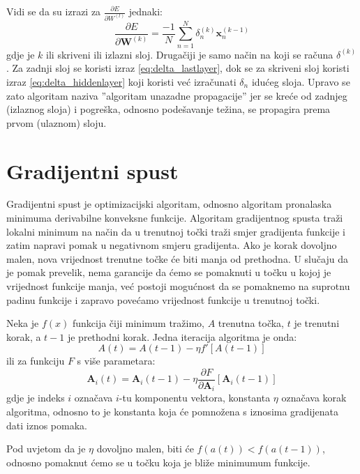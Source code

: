 \documentclass[times, utf8, diplomski, numeric]{fer}
\begin{document}
Vidi se da su izrazi za $\frac{\partial E}{\partial W^{(l)}}$ jednaki:
\begin{equation}
  \frac{\partial E}{\partial \boldsymbol{W}^{(k)}}
    = \frac{-1}{N} \sum_{n=1}^{N} \delta_n^{(k)} \boldsymbol{x}_n^{(k-1)}
\end{equation}
gdje je $k$ ili skriveni ili izlazni sloj. Drugačiji je samo način na koji se računa $\delta^{(k)}$. Za zadnji sloj se koristi izraz \ref{eq:delta_lastlayer}, dok se za skriveni sloj koristi izraz \ref{eq:delta_hiddenlayer} koji koristi već izračunati $\delta_n$ idućeg sloja. Upravo se zato algoritam naziva ''algoritam unazadne propagacije'' jer se kreće od zadnjeg (izlaznog sloja) i pogreška, odnosno podešavanje težina, se propagira prema prvom (ulaznom) sloju.

\section{Gradijentni spust}

Gradijentni spust je optimizacijski algoritam, odnosno algoritam pronalaska minimuma derivabilne konveksne funkcije. Algoritam gradijentnog spusta traži lokalni minimum na način da u trenutnoj točki traži smjer gradijenta funkcije i zatim napravi pomak u negativnom smjeru gradijenta. Ako je korak dovoljno malen, nova vrijednost trenutne točke će biti manja od prethodna.
U slučaju da je pomak prevelik, nema garancije da ćemo se pomaknuti u točku u kojoj je vrijednost funkcije manja, već postoji mogućnost da se pomaknemo na suprotnu padinu funkcije i zapravo povećamo vrijednost funkcije u trenutnoj točki.

Neka je $f(x)$ funkcija čiji minimum tražimo, $A$ trenutna točka, $t$ je trenutni korak, a $t-1$ je prethodni korak. Jedna iteracija algoritma je onda:
\begin{equation}
  A(t) = A(t-1) - \eta f' \left[ A(t-1) \right]
\end{equation}
ili za funkciju $F$ s više parametara:
\begin{equation}
  \boldsymbol{A}_i(t) = \boldsymbol{A}_i(t-1) - \eta \frac{\partial F}{\partial \boldsymbol{A}_i} \left[ \boldsymbol{A}_i(t-1) \right]
\end{equation}
gdje je indeks $i$ označava $i$-tu komponentu vektora, konstanta $\eta$  označava korak algoritma, odnosno to je konstanta koja će pomnožena s iznosima gradijenata dati iznos pomaka.

Pod uvjetom da je $\eta$ dovoljno malen, biti će $f(a(t)) < f(a(t-1))$, odnosno pomaknut ćemo se u točku koja je bliže minimumum funkcije.
\end{document}
